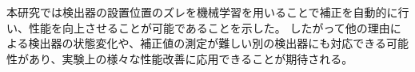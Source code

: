 本研究では検出器の設置位置のズレを機械学習を用いることで補正を自動的に行い、性能を向上させることが可能であることを示した。
したがって他の理由による検出器の状態変化や、補正値の測定が難しい別の検出器にも対応できる可能性があり、実験上の様々な性能改善に応用できることが期待される。

